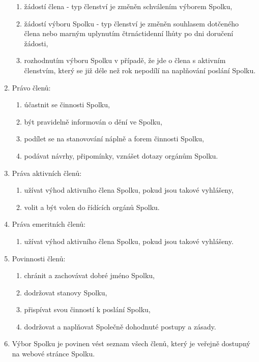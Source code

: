 \documentclass[11pt,a4paper]{article}
\begin{document}
\begin{enumerate}[itemsep=0pt]
    \begin{enumerate}[itemsep=0pt,topsep=0pt]
        \item žádostí člena - typ členství je změněn schválením výborem Spolku,
	\item žádostí výboru Spolku - typ členství je změněn souhlasem dotčeného člena nebo marným uplynutím čtrnáctidenní lhůty po dni doručení žádosti,
	\item rozhodnutím výboru Spolku v případě, že jde o člena s aktivním členstvím, který se již déle než rok nepodílí na naplňování poslání Spolku. 
    \end{enumerate}
    \item Právo členů:
    \begin{enumerate}[itemsep=0pt,topsep=0pt]
        \item účastnit se činnosti Spolku,
        \item být pravidelně informován o dění ve Spolku,
        \item podílet se na stanovování náplně a forem činnosti Spolku,
        \item podávat návrhy, připomínky, vznášet dotazy orgánům Spolku.
    \end{enumerate}
    \item Práva aktivních členů:
    \begin{enumerate}[itemsep=0pt,topsep=0pt]
        \item užívat výhod aktivního člena Spolku, pokud jsou takové vyhlášeny,
        \item volit a být volen do řídících orgánů Spolku.
    \end{enumerate}
    \item Práva emeritních členů:
    \begin{enumerate}[itemsep=0pt,topsep=0pt]
        \item užívat výhod aktivního člena Spolku, pokud jsou takové vyhlášeny.
    \end{enumerate}
    \item Povinnosti členů:
    \begin{enumerate}[itemsep=0pt,topsep=0pt]
        \item chránit a zachovávat dobré jméno Spolku,
        \item dodržovat stanovy Spolku,
        \item přispívat svou činností k poslání Spolku,
        \item dodržovat a naplňovat Společně dohodnuté postupy a zásady.
    \end{enumerate}
    \item Výbor Spolku je povinen vést seznam všech členů,
    který je veřejně dostupný na webové stránce Spolku. 
\end{enumerate}
\end{document}
